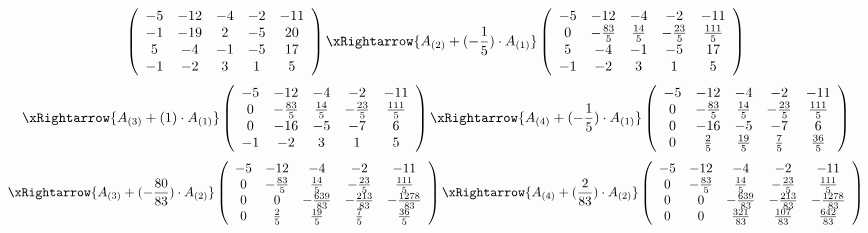 $$
\left(
\begin{array}{ccccc}
-5 & -12 & -4 & -2 & -11\\
-1 & -19 & 2 & -5 & 20\\
5 & -4 & -1 & -5 & 17\\
-1 & -2 & 3 & 1 & 5\\
\end{array}
\right)
\xRightarrow{A_{(2)} + (-\frac{1}{5}) \cdot A_{(1)}}
\left(
\begin{array}{ccccc}
-5 & -12 & -4 & -2 & -11\\
0 & -\frac{83}{5} & \frac{14}{5} & -\frac{23}{5} & \frac{111}{5}\\
5 & -4 & -1 & -5 & 17\\
-1 & -2 & 3 & 1 & 5\\
\end{array}
\right)
$$
$$
\xRightarrow{A_{(3)} + (1) \cdot A_{(1)}}
\left(
\begin{array}{ccccc}
-5 & -12 & -4 & -2 & -11\\
0 & -\frac{83}{5} & \frac{14}{5} & -\frac{23}{5} & \frac{111}{5}\\
0 & -16 & -5 & -7 & 6\\
-1 & -2 & 3 & 1 & 5\\
\end{array}
\right)
\xRightarrow{A_{(4)} + (-\frac{1}{5}) \cdot A_{(1)}}
\left(
\begin{array}{ccccc}
-5 & -12 & -4 & -2 & -11\\
0 & -\frac{83}{5} & \frac{14}{5} & -\frac{23}{5} & \frac{111}{5}\\
0 & -16 & -5 & -7 & 6\\
0 & \frac{2}{5} & \frac{19}{5} & \frac{7}{5} & \frac{36}{5}\\
\end{array}
\right)
$$
$$
\xRightarrow{A_{(3)} + (-\frac{80}{83}) \cdot A_{(2)}}
\left(
\begin{array}{ccccc}
-5 & -12 & -4 & -2 & -11\\
0 & -\frac{83}{5} & \frac{14}{5} & -\frac{23}{5} & \frac{111}{5}\\
0 & 0 & -\frac{639}{83} & -\frac{213}{83} & -\frac{1278}{83}\\
0 & \frac{2}{5} & \frac{19}{5} & \frac{7}{5} & \frac{36}{5}\\
\end{array}
\right)
\xRightarrow{A_{(4)} + (\frac{2}{83}) \cdot A_{(2)}}
\left(
\begin{array}{ccccc}
-5 & -12 & -4 & -2 & -11\\
0 & -\frac{83}{5} & \frac{14}{5} & -\frac{23}{5} & \frac{111}{5}\\
0 & 0 & -\frac{639}{83} & -\frac{213}{83} & -\frac{1278}{83}\\
0 & 0 & \frac{321}{83} & \frac{107}{83} & \frac{642}{83}\\
\end{array}
\right)
$$
